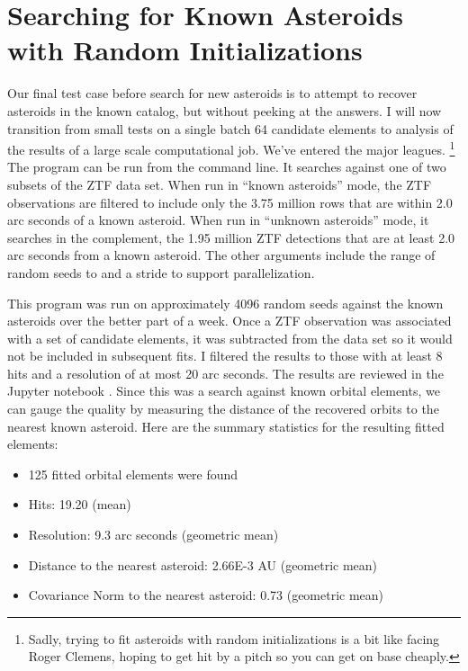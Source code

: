 \section{Searching for Known Asteroids with Random Initializations}
\label{section_results_known_ast_random}
Our final test case before search for new asteroids is to attempt to recover asteroids in the known catalog, but without peeking at the answers.
I will now transition from small tests on a single batch 64 candidate elements to analysis of the results of a large scale computational job.
We've entered the major leagues.
\footnote{Sadly, trying to fit asteroids with random initializations is a bit like facing Roger Clemens,
hoping to get hit by a pitch so you can get on base cheaply.}
The program  can be run from the command line.
It searches against one of two subsets of the ZTF data set.
When run in ``known asteroids'' mode, the ZTF observations are filtered to include only the 3.75 million rows that are within 2.0 arc seconds of a known asteroid.
When run in ``unknown asteroids'' mode, it searches in the complement, the 1.95 million ZTF detections that are at least 2.0 arc seconds from a known asteroid.
The other arguments include the range of random seeds  to  and a stride to support parallelization.

This program was run on approximately 4096 random seeds against the known asteroids over the better part of a week.
Once a ZTF observation was associated with a set of candidate elements, it was subtracted from the data set so it would not be included in subsequent fits.
I filtered the results to those with at least 8 hits and a resolution of at most 20 arc seconds.
The results are reviewed in the Jupyter notebook .
Since this was a search against known orbital elements, 
we can gauge the quality by measuring the distance of the recovered orbits to the nearest known asteroid.
Here are the summary statistics for the resulting fitted elements:
\begin{itemize}
\item 125 fitted orbital elements were found
\item Hits: 19.20 (mean)
\item Resolution: 9.3 arc seconds (geometric mean)
\item Distance to the nearest asteroid: 2.66E-3 AU (geometric mean)
\item Covariance Norm to the nearest asteroid: 0.73 (geometric mean)
\end{itemize}

